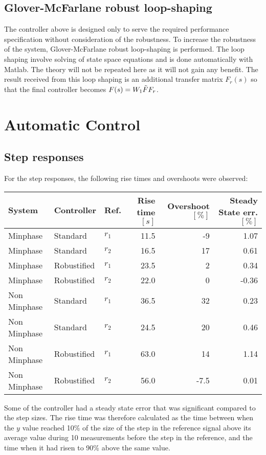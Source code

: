 \documentclass[a4paper,12pt,oneside,onecolumn]{article}
\begin{document}
\subsection{Glover-McFarlane robust loop-shaping}
The controller above is designed only to serve the required performance specification without consideration of the robustness. To increase the robustness of the system, Glover-McFarlane robust loop-shaping is performed. The loop shaping involve solving of state space equations and is done automatically with Matlab. The theory will not be repeated here as it will not gain any benefit. The result received from this loop shaping is an additional transfer matrix $F_r(s)$ so that the final controller becomes $F(s) = W_1 \Tilde{F} F_r $.

\section{Automatic Control}

\subsection{Step responses}
For the step responses, the following rise times and overshoots were observed:
\begin{center}
    \begin{tabular}{|l|l|l||r|r|r}
    System & Controller &  Ref. & Rise time $[s]$ & Overshoot $[\%]$ & Steady State err. $[\%]$\\
    \hline
    Minphase    & Standard      & $r_1$ & 11.5  & -9    & 1.07 \\
    Minphase    & Standard      & $r_2$ & 16.5  & 17    & 0.61 \\
    Minphase    & Robustified   & $r_1$ & 23.5  & 2     & 0.34 \\
    Minphase    & Robustified   & $r_2$ & 22.0  & 0     & -0.36 \\
    Non Minphase & Standard     & $r_1$ & 36.5  & 32    & 0.23\\
    Non Minphase & Standard     & $r_2$ & 24.5  & 20    & 0.46\\
    Non Minphase & Robustified  & $r_1$ & 63.0  & 14    & 1.14\\
    Non Minphase & Robustified  & $r_2$ & 56.0  & -7.5  & 0.01\\
    \end{tabular}
\end{center}
Some of the controller had a steady state error that was significant compared to the step sizes. The rise time was therefore calculated as the time between when the $y$ value reached 10\% of the size of the step in the reference signal above its average value during 10 measurements before the step in the reference, and the time when it had risen to 90\% above the same value. 
\end{document}
